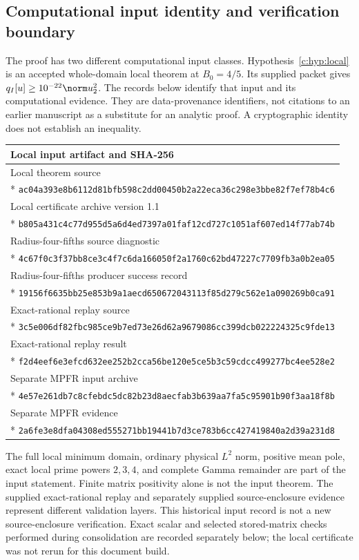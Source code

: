 \documentclass[11pt,a4paper]{article}
\numberwithin{equation}{section}
\theoremstyle{definition}\newtheorem{definition}[theorem]{Definition}
\theoremstyle{remark}\newtheorem{remark}[theorem]{Remark}
\begin{document}
\subsection{Computational input identity and verification boundary}\label{c:app:provenance}
The proof has two different computational input classes.
Hypothesis~\ref{c:hyp:local} is an accepted whole-domain local theorem at ${B_0}=4/5$.
Its supplied packet gives $q_I[u]\ge10^{-22}\norm u_2^2$.
The records below identify that input and its computational evidence.
They are data-provenance identifiers, not citations to an earlier manuscript as a substitute for an analytic proof.
A cryptographic identity does not establish an inequality.

\begingroup\small
\begin{longtable}{@{}p{}@{}}
\toprule Local input artifact and SHA-256\\\midrule\endhead
Local theorem source\\*
\nolinkurl{ac04a393e8b6112d81bfb598c2dd00450b2a22eca36c298e3bbe82f7ef78b4c6}\\[3pt]
Local certificate archive version 1.1\\*
\nolinkurl{b805a431c4c77d955d5a6d4ed7397a01faf12cd727c1051af607ed14f77ab74b}\\[3pt]
Radius-four-fifths source diagnostic\\*
\nolinkurl{4c67f0c3f37bb8ce3c4f7c6da166050f2a1760c62bd47227c7709fb3a0b2ea05}\\[3pt]
Radius-four-fifths producer success record\\*
\nolinkurl{19156f6635bb25e853b9a1aecd650672043113f85d279c562e1a090269b0ca91}\\[3pt]
Exact-rational replay source\\*
\nolinkurl{3c5e006df82fbc985ce9b7ed73e26d62a9679086cc399dcb022224325c9fde13}\\[3pt]
Exact-rational replay result\\*
\nolinkurl{f2d4eef6e3efcd632ee252b2cca56be120e5ce5b3c59cdcc499277bc4ee528e2}\\[3pt]
Separate MPFR input archive\\*
\nolinkurl{4e57e261db7c8cfebdc5dc82b23d8aecfab3b639aa7fa5c95901b90f3aa18f8b}\\[3pt]
Separate MPFR evidence\\*
\nolinkurl{2a6fe3e8dfa04308ed555271bb19441b7d3ce783b6cc427419840a2d39a231d8}\\
\bottomrule
\end{longtable}\endgroup
The full local minimum domain, ordinary physical $L^2$ norm, positive mean pole, exact local prime powers $2,3,4$, and complete Gamma remainder are part of the input statement.
Finite matrix positivity alone is not the input theorem.
The supplied exact-rational replay and separately supplied source-enclosure evidence represent different validation layers.
This historical input record is not a new source-enclosure verification. Exact scalar and selected stored-matrix checks performed during consolidation are recorded separately below; the local certificate was not rerun for this document build.
\end{document}
